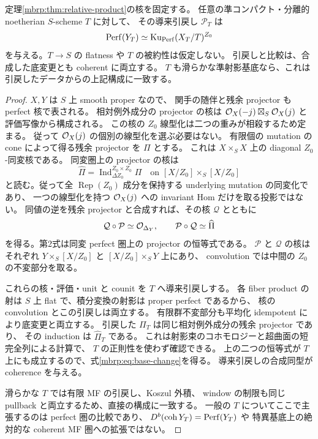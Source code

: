 \begin{corollary}[非平坦底変更後の比較]
\label{mbrp:cor:base-change}
定理\ref{mbrp:thm:relative-product}の核を固定する。
任意の準コンパクト・分離的 noetherian $S$-scheme $T$ に対して、
その導来引戻し $\mathcal P_T$ は
\begin{equation}\label{mbrp:eq:base-change}
 \operatorname{Perf}(Y_T)\simeq\operatorname{Ku}_{\operatorname{Perf}}(X_T/T)^{Z_0}
\end{equation}
を与える。$T\to S$ の flatness や $T$ の被約性は仮定しない。
引戻しと比較は、合成した底変更とも coherent に両立する。
$T$ も滑らかな準射影基底なら、これは引戻したデータからの上記構成に一致する。
\end{corollary}
\begin{proof}
$X,Y$ は $S$ 上 smooth proper なので、
関手の随伴と残余 projector も perfect 核で表される。
相対例外成分の projector の核は
$\mathcal O_X(-j)\boxtimes_S\mathcal O_X(j)$ と評価写像から構成される。
この核の $Z_0$ 線型化は二つの重みが相殺するため定まる。
従って $\mathcal O_X(j)$ の個別の線型化を選ぶ必要はない。
有限個の mutation の cone によって得る残余 projector を $\Pi$ とする。
これは $X\times_SX$ 上の diagonal $Z_0$-同変核である。
同変圏上の projector の核は
\[
 \widehat\Pi=
 \operatorname{Ind}_{\Delta Z_0}^{Z_0\times Z_0}\Pi
 \quad\text{on }[X/Z_0]\times_S[X/Z_0]
\]
と読む。従って全 $\operatorname{Rep}(Z_0)$ 成分を保持する underlying mutation の同変化であり、
一つの線型化を持つ $\mathcal O_X(j)$ への invariant Hom だけを取る投影ではない。
同値の逆を残余 projector と合成すれば、その核 $\mathcal Q$ とともに
\[
 \mathcal Q\circ\mathcal P\simeq\mathcal O_{\Delta_Y},\qquad
 \mathcal P\circ\mathcal Q\simeq\widehat\Pi
\]
を得る。第2式は同変 perfect 圏上の projector の恒等式である。
$\mathcal P$ と $\mathcal Q$ の核はそれぞれ
$Y\times_S[X/Z_0]$ と $[X/Z_0]\times_SY$ 上にあり、
convolution では中間の $Z_0$ の不変部分を取る。

これらの核・評価・unit と counit を $T$ へ導来引戻しする。
各 fiber product の射は $S$ 上 flat で、積分変換の射影は proper perfect であるから、
核の convolution とこの引戻しは両立する。
有限群不変部分も平均化 idempotent により底変更と両立する。
引戻した $\Pi_T$ は同じ相対例外成分の残余 projector であり、
その induction は $\widehat\Pi_T$ である。
これは射影束のコホモロジーと超曲面の短完全列による計算で、
$T$ の正則性を使わず確認できる。
上の二つの恒等式が $T$ 上にも成立するので、式\eqref{mbrp:eq:base-change}を得る。
導来引戻しの合成同型が coherence を与える。

滑らかな $T$ では有限 MF の引戻し、Koszul 外積、
window の制限も同じ pullback と両立するため、直接の構成に一致する。
一般の $T$ についてここで主張するのは perfect 圏の比較であり、
$D^b(\operatorname{coh}Y_T)=\operatorname{Perf}(Y_T)$ や
特異基底上の絶対的な coherent MF 圏への拡張ではない。
\end{proof}

